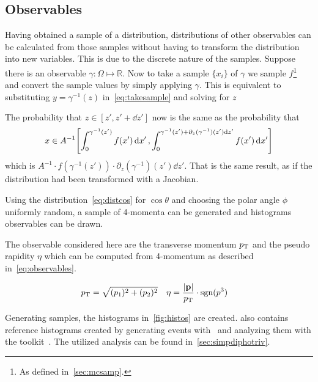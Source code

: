 \subsection{Observables}
\label{sec:obs}

Having obtained a sample of a distribution, distributions of other
observables can be calculated from those samples without having to
transform the distribution into new variables. This is due to the
discrete nature of the samples. Suppose there is an observable
\(\gamma\colon\Omega\mapsto\mathbb{R}\). Now to take a sample
\(\{x_i\}\) of \(\gamma\) we sample \(f\)\footnote{As defined
  in~\ref{sec:mcsamp}.} and convert the sample values by simply
applying \(\gamma\). This is equivalent to
substituting \(y=\gamma^{-1}(z)\) in~\eqref{eq:takesample} and solving
for \(z\)

The probability that \(z\in[z', z'+\dd{z'}]\) now is the same as the
probability that
\[\displaystyle x\in
  A^{-1}\qty[\int_{0}^{\gamma^{-1}(z')}f(x')\dd{x'},
  \int_{0}^{\gamma^{-1}(z')+\partial_z(\gamma^{-1})(z')\dd{z'}}f(x')\dd{x'}]\]
which is
\(A^{-1}\cdot f(\gamma^{-1}(z'))\cdot \partial_z(\gamma^{-1})(z')\dd{z'}\). That
is the same result, as if the distribution had been transformed with a
Jacobian.

Using the distribution~\eqref{eq:distcos} for \(\cos\theta\) and
choosing the polar angle \(\phi\) uniformly random, a sample of
4-momenta can be generated and histograms observables can be drawn.

The observable considered here are the transverse momentum \(p_\mathrm{T}\) and
the pseudo rapidity \(\eta\) which can be computed from 4-momentum as
described in~\eqref{eq:observables}.

\begin{align}
  \label{eq:observables}
  p_\mathrm{T} &= \sqrt{(p_1)^2+(p_2)^2} & \eta &=
                                         \frac{\abs{\vb{p}}}{p_\mathrm{T}}\cdot\operatorname{sgn}(p^3)
\end{align}

Generating  samples, the histograms
in~\ref{fig:histos} are created.  also contains
reference histograms created by generating events with \sherpa\ and
analyzing them with the \rivet toolkit~\cite{Bierlich:2019rhm}. The
utilized analysis can be found in~\ref{sec:simpdiphotriv}.

